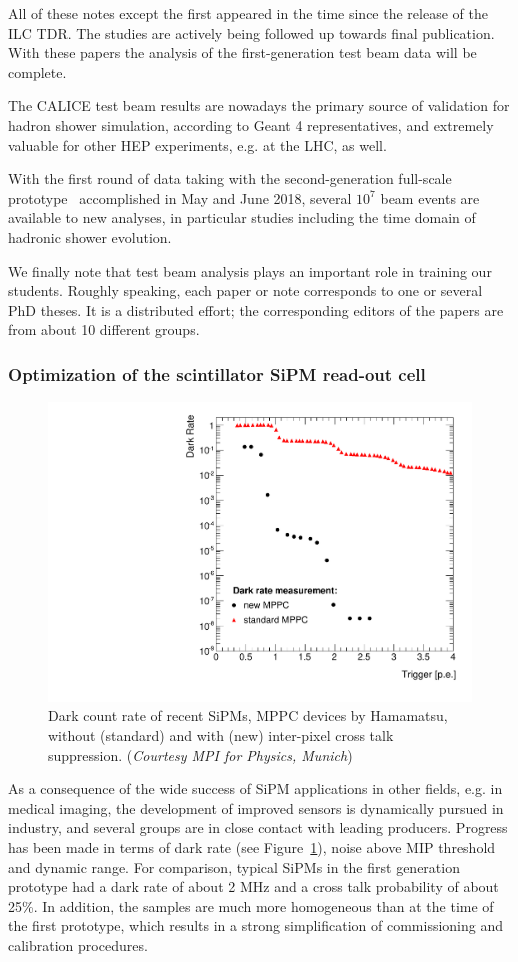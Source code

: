 All of these notes except the first appeared in the time since the release of the ILC TDR. The studies are actively being followed up towards final publication. With these papers the analysis of the first-generation test beam data will be complete.

The CALICE test beam results are nowadays the primary source of validation for hadron shower simulation, according to Geant 4 representatives, and extremely valuable for other HEP experiments, e.g. at the LHC, as well.

With the first round of data taking with the second-generation full-scale prototype~\cite{Sefkow:2018rhp} accomplished in May and June 2018, several $10^7$ beam events are available to new analyses, in particular studies including the time domain of hadronic shower evolution.

We finally note that test beam analysis plays an important role in training our students. Roughly speaking, each paper or note corresponds to one or several PhD theses. It is a distributed effort; the corresponding editors of the papers are from about 10 different groups.

\subsubsection{Optimization of the scintillator SiPM read-out cell}
\label{sec:OptimizationSiPMRO}

\begin{figure}
	\centering
	\includegraphics[width=.5\linewidth]{Calorimeter/AHCAL/DarkCount}
	\caption{Dark count rate of recent SiPMs, MPPC devices by Hamamatsu, without (standard) and with (new) inter-pixel cross talk suppression. ({\it Courtesy MPI for Physics, Munich})}
	\label{fig:Calorimeter:AHCAL:DarkCount}
\end{figure}

As a consequence of the wide success of SiPM applications in other fields, e.g. in medical imaging, the development of improved sensors is dynamically pursued in industry, and several groups are in close contact with leading producers. Progress has been made in terms of dark rate (see Figure~\ref{fig:Calorimeter:AHCAL:DarkCount}), noise above MIP threshold and dynamic range. For comparison, typical SiPMs in the first generation prototype had a dark rate of about 2 MHz and a cross talk probability of about 25\%. In addition, the samples are much more homogeneous than at the time of the first prototype, which results in a strong simplification of commissioning and calibration procedures.

